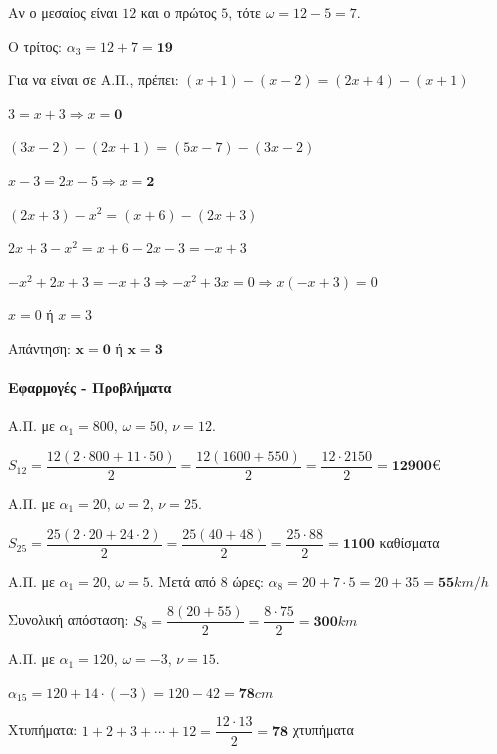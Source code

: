 \documentclass[11pt,a4paper,modern]{FFExercises}
\begin{document}
\lysh[30]
Αν ο μεσαίος είναι $12$ και ο πρώτος $5$, τότε $\omega=12-5=7$.

Ο τρίτος: $\alpha_3=12+7=\boldsymbol{19}$

\lysh[31]
Για να είναι σε Α.Π., πρέπει: $(x+1)-(x-2)=(2x+4)-(x+1)$

$3=x+3 \Rightarrow x=\boldsymbol{0}$

\lysh[32]
\begin{alist}
\item $(3x-2)-(2x+1)=(5x-7)-(3x-2)$

$x-3=2x-5 \Rightarrow x=\boldsymbol{2}$

\item $(2x+3)-x^2=(x+6)-(2x+3)$

$2x+3-x^2=x+6-2x-3=-x+3$

$-x^2+2x+3=-x+3 \Rightarrow -x^2+3x=0 \Rightarrow x(-x+3)=0$

$x=0$ ή $x=3$

Απάντηση: $\boldsymbol{x=0}$ ή $\boldsymbol{x=3}$
\end{alist}

\paragraph{Εφαρμογές - Προβλήματα}

\lysh[33]
Α.Π. με $\alpha_1=800$, $\omega=50$, $\nu=12$.

$S_{12}=\dfrac{12(2\cdot 800+11\cdot 50)}{2}=\dfrac{12(1600+550)}{2}=\dfrac{12\cdot 2150}{2}=\boldsymbol{12900}$\euro

\lysh[34]
Α.Π. με $\alpha_1=20$, $\omega=2$, $\nu=25$.

$S_{25}=\dfrac{25(2\cdot 20+24\cdot 2)}{2}=\dfrac{25(40+48)}{2}=\dfrac{25\cdot 88}{2}=\boldsymbol{1100}$ καθίσματα

\lysh[35]
\begin{alist}
\item Α.Π. με $\alpha_1=20$, $\omega=5$. Μετά από $8$ ώρες: $\alpha_8=20+7\cdot 5=20+35=\boldsymbol{55}\si{km/h}$

\item Συνολική απόσταση: $S_8=\dfrac{8(20+55)}{2}=\dfrac{8\cdot 75}{2}=\boldsymbol{300}\si{km}$
\end{alist}

\lysh[36]
Α.Π. με $\alpha_1=120$, $\omega=-3$, $\nu=15$.

$\alpha_{15}=120+14\cdot(-3)=120-42=\boldsymbol{78}\si{cm}$

\lysh[37]
Χτυπήματα: $1+2+3+\cdots+12=\dfrac{12\cdot 13}{2}=\boldsymbol{78}$ χτυπήματα
\end{document}
